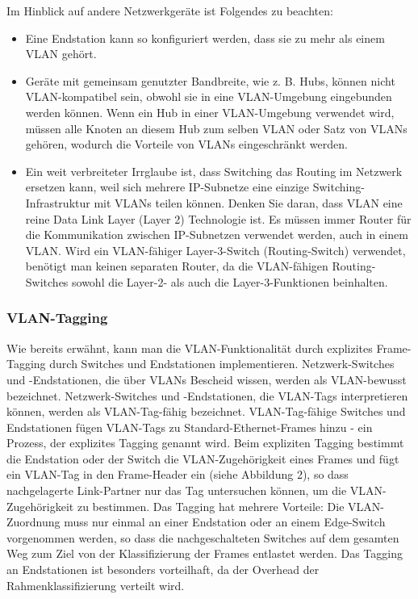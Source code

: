         Im Hinblick auf andere Netzwerkgeräte ist Folgendes zu beachten:
        \begin{itemize}
            \item Eine Endstation kann so konfiguriert werden, dass sie zu mehr als einem VLAN gehört.
            \item Geräte mit gemeinsam genutzter Bandbreite, wie z. B. Hubs, können nicht VLAN-kompatibel sein, obwohl sie in eine VLAN-Umgebung eingebunden werden können. Wenn ein Hub in einer VLAN-Umgebung verwendet wird, müssen alle Knoten an diesem Hub zum selben VLAN oder Satz von VLANs gehören, wodurch die Vorteile von VLANs eingeschränkt werden.
            \item Ein weit verbreiteter Irrglaube ist, dass Switching das Routing im Netzwerk ersetzen kann, weil sich mehrere IP-Subnetze eine einzige Switching-Infrastruktur mit VLANs teilen können. Denken Sie daran, dass VLAN eine reine Data Link Layer (Layer 2) Technologie ist. Es müssen immer Router für die Kommunikation zwischen IP-Subnetzen verwendet werden, auch in einem VLAN. Wird ein VLAN-fähiger Layer-3-Switch (Routing-Switch) verwendet, benötigt man keinen separaten Router, da die VLAN-fähigen Routing-Switches sowohl die Layer-2- als auch die Layer-3-Funktionen beinhalten.
        \end{itemize}

        \subsubsection{VLAN-Tagging}
        Wie bereits erwähnt, kann man die VLAN-Funktionalität durch explizites Frame-Tagging 
        durch Switches und Endstationen implementieren. Netzwerk-Switches und -Endstationen, die 
        über VLANs Bescheid wissen, werden als VLAN-bewusst bezeichnet. Netzwerk-Switches und -Endstationen, die VLAN-Tags interpretieren können, werden als VLAN-Tag-fähig bezeichnet. VLAN-Tag-fähige Switches und Endstationen fügen VLAN-Tags zu Standard-Ethernet-Frames hinzu - ein Prozess, der explizites Tagging genannt wird. Beim expliziten Tagging bestimmt die Endstation oder der Switch die VLAN-Zugehörigkeit eines Frames und fügt ein VLAN-Tag in den Frame-Header ein (siehe Abbildung 2), so dass nachgelagerte Link-Partner nur das Tag untersuchen können, um die VLAN-Zugehörigkeit zu bestimmen.
        Das Tagging hat mehrere Vorteile: Die VLAN-Zuordnung muss nur einmal an einer Endstation oder an einem Edge-Switch vorgenommen werden, so dass die nachgeschalteten Switches auf dem gesamten Weg zum Ziel von der Klassifizierung der Frames entlastet werden. Das Tagging an Endstationen ist besonders vorteilhaft, da der Overhead der Rahmenklassifizierung verteilt wird.

